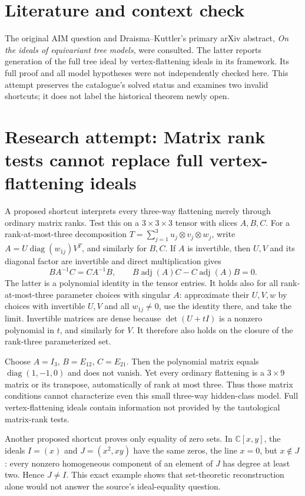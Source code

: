 \documentclass[11pt]{article}
\begin{document}
\section{Literature and context check}
The original AIM question and Draisma--Kuttler's primary arXiv abstract,
\emph{On the ideals of equivariant tree models}, were consulted. The latter
reports generation of the full tree ideal by vertex-flattening ideals in its
framework. Its full proof and all model hypotheses were not independently
checked here. This attempt preserves the catalogue's solved status and examines
two invalid shortcuts; it does not label the historical theorem newly open.
\section{Research attempt: Matrix rank tests cannot replace full vertex-flattening ideals}
A proposed shortcut interprets every three-way flattening merely through
ordinary matrix ranks. Test this on a $3\times3\times3$ tensor with slices
$A,B,C$. For a rank-at-most-three decomposition
$T=\sum_{j=1}^3u_j\otimes v_j\otimes w_j$, write
$A=U\operatorname{diag}(w_{1j})V^T$, and similarly for $B,C$.
If $A$ is invertible, then $U,V$ and its diagonal factor are invertible and
direct multiplication gives
\[
 BA^{-1}C=CA^{-1}B,
 \qquad B\operatorname{adj}(A)C-C\operatorname{adj}(A)B=0.
\]
The latter is a polynomial identity in the tensor entries. It holds also for
all rank-at-most-three parameter choices with singular $A$: approximate their
$U,V,w$ by choices with invertible $U,V$ and all $w_{1j}\ne0$, use the identity
there, and take the limit. Invertible matrices are dense because
$\det(U+tI)$ is a nonzero polynomial in $t$, and similarly for $V$.
It therefore also holds on the closure of the rank-three parameterized set.

Choose $A=I_3$, $B=E_{12}$, $C=E_{21}$. Then the polynomial matrix equals
$\operatorname{diag}(1,-1,0)$ and does not vanish. Yet every ordinary
flattening is a $3\times9$ matrix or its transpose, automatically of rank at
most three. Thus those matrix conditions cannot characterize even this small
three-way hidden-class model. Full vertex-flattening ideals contain information
not provided by the tautological matrix-rank tests.

Another proposed shortcut proves only equality of zero sets. In
$\mathbb C[x,y]$, the ideals $I=(x)$ and $J=(x^2,xy)$ have the same zeros,
the line $x=0$, but $x\notin J$: every nonzero homogeneous component of an
element of $J$ has degree at least two. Hence $J\ne I$. This exact example
shows that set-theoretic reconstruction alone would not answer the source's
ideal-equality question.
\end{document}
